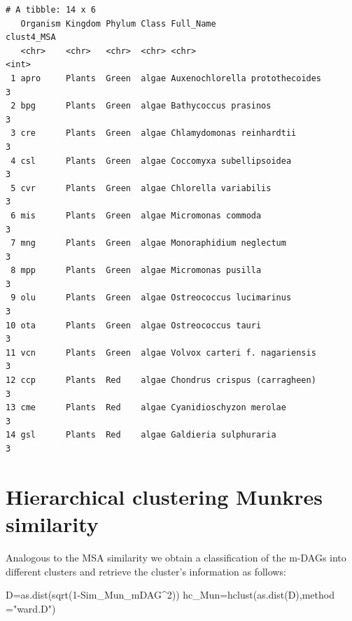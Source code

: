 \documentclass[
  letterpaper,
  DIV=11,
  numbers=noendperiod]{scrreprt}
\newenvironment{Shaded}{}{}
\newcommand{\AttributeTok}[1]{\textcolor[rgb]{0.78,0.47,0.87}{#1}}
\newcommand{\DecValTok}[1]{\textcolor[rgb]{0.82,0.60,0.40}{#1}}
\newcommand{\FunctionTok}[1]{\textcolor[rgb]{0.38,0.69,0.94}{#1}}
\newcommand{\NormalTok}[1]{\textcolor[rgb]{0.67,0.70,0.75}{#1}}
\newcommand{\OtherTok}[1]{\textcolor[rgb]{0.15,0.68,0.38}{#1}}
\newcommand{\SpecialCharTok}[1]{\textcolor[rgb]{0.34,0.71,0.76}{#1}}
\newcommand{\StringTok}[1]{\textcolor[rgb]{0.60,0.76,0.47}{#1}}
\begin{document}
\begin{verbatim}
# A tibble: 14 x 6
   Organism Kingdom Phylum Class Full_Name                      clust4_MSA
   <chr>    <chr>   <chr>  <chr> <chr>                               <int>
 1 apro     Plants  Green  algae Auxenochlorella protothecoides          3
 2 bpg      Plants  Green  algae Bathycoccus prasinos                    3
 3 cre      Plants  Green  algae Chlamydomonas reinhardtii               3
 4 csl      Plants  Green  algae Coccomyxa subellipsoidea                3
 5 cvr      Plants  Green  algae Chlorella variabilis                    3
 6 mis      Plants  Green  algae Micromonas commoda                      3
 7 mng      Plants  Green  algae Monoraphidium neglectum                 3
 8 mpp      Plants  Green  algae Micromonas pusilla                      3
 9 olu      Plants  Green  algae Ostreococcus lucimarinus                3
10 ota      Plants  Green  algae Ostreococcus tauri                      3
11 vcn      Plants  Green  algae Volvox carteri f. nagariensis           3
12 ccp      Plants  Red    algae Chondrus crispus (carragheen)           3
13 cme      Plants  Red    algae Cyanidioschyzon merolae                 3
14 gsl      Plants  Red    algae Galdieria sulphuraria                   3
\end{verbatim}

\section{Hierarchical clustering Munkres
similarity}\label{hierarchical-clustering-munkres-similarity}

Analogous to the MSA similarity we obtain a classification of the m-DAGs
into different clusters and retrieve the cluster's information as
follows:

\begin{Shaded}
\begin{Highlighting}[]
\NormalTok{D}\OtherTok{=}\FunctionTok{as.dist}\NormalTok{(}\FunctionTok{sqrt}\NormalTok{(}\DecValTok{1}\SpecialCharTok{{-}}\NormalTok{Sim\_Mun\_mDAG}\SpecialCharTok{\^{}}\DecValTok{2}\NormalTok{))}
\NormalTok{hc\_Mun}\OtherTok{=}\FunctionTok{hclust}\NormalTok{(}\FunctionTok{as.dist}\NormalTok{(D),}\AttributeTok{method =}\StringTok{"ward.D"}\NormalTok{)}
\end{Highlighting}
\end{Shaded}

\begin{Shaded}
\end{Shaded}
\end{document}

